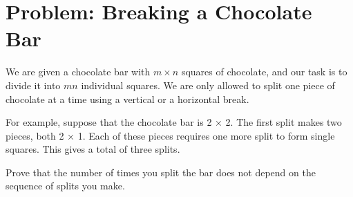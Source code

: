 \documentclass[a4paper]{article}
\begin{document}
	\section{Problem: Breaking a Chocolate Bar}%
	\label{sec:Problem: Breaking a Chocolate Bar}

	We are given a chocolate bar with $m \times n$ squares of chocolate, and our
	task is to divide it into $mn$ individual squares. We are only allowed to
	split one piece of chocolate at a time using a vertical or a horizontal
	break.

	For example, suppose that the chocolate bar is 2 × 2. The first split
	makes two pieces, both 2 × 1. Each of these pieces requires one more split to
	form single squares. This gives a total of three splits.

	Prove that the number of times you split the bar does not depend on the
	sequence of splits you make.
\end{document}

